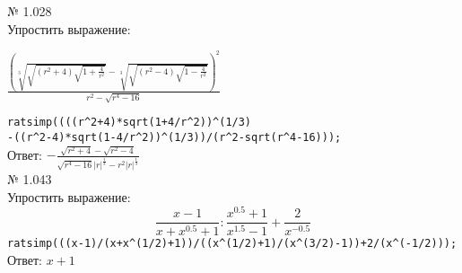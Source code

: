 \documentclass[article, bachelor, och, pract]{SCWorks}
\begin{document}
№ 1.028\\
Упростить выражение:

$ \frac{\left(\sqrt[3]{\sqrt{(r^2+4)\sqrt{1+\frac{4}{r^2}}}}-\sqrt[3]{\sqrt{(r^2-4)\sqrt{1-\frac{4}{r^2}}}}\right)^2}{r^2-\sqrt{r^4-16}}$


\texttt{ratsimp((((r\^{}2+4)*sqrt(1+4/r\^{}2))\^{}(1/3)\\-((r\^{}2-4)*sqrt(1-4/r\^{}2))\^{}(1/3))/(r\^{}2-sqrt(r\^{}4-16)));}\\

Ответ:
$-\frac{\sqrt{r^2+4}-\sqrt{r^2-4}}{\sqrt{r^4-16}|r|^{\frac{1}{3}}-r^2|r|^{\frac{1}{3}}}$
\\

№ 1.043\\
Упростить выражение:
$$ \frac{x-1}{x+x^{0.5}+1}:\frac{x^{0.5}+1}{x^{1.5}-1}+\frac{2}{x^{-0.5}}$$
\texttt{ratsimp(((x-1)/(x+x\^{}(1/2)+1))/((x\^{}(1/2)+1)/(x\^{}(3/2)-1))+2/(x\^{}(-1/2)));}\\
Ответ: 
$x+1$


\newpage
\end{document}
